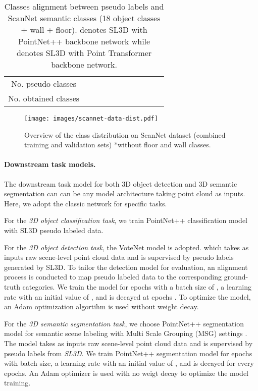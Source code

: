 \documentclass{article}
\begin{document}
\begin{table}[ht]
\caption{Classes alignment between pseudo labels and ScanNet semantic classes (18 object classes + wall + floor).  denotes SL3D with PointNet++ backbone network while  denotes SL3D with Point Transformer backbone network.}
\centering
\begin{tabular}{c | c c c c c c c c c c}

\toprule

 {No. pseudo classes} & {} & {} & {} & {} & {} & {} & {} & {} & {} & {} \\  
 {No. obtained classes} & {} & {} & {} & {} & {} & {} & {} & {} & {} & {} \\ \bottomrule
\end{tabular}
\label{table:1}
\end{table}

\vspace{-5mm}

\begin{wrapfigure}{r}{5.5cm}
\label{wrap-fig:1}
\texttt{[image: images/scannet-data-dist.pdf]}
\caption{Overview of the class distribution on ScanNet dataset (combined training and validation sets) *without floor and wall classes.}
\end{wrapfigure}

\paragraph{Downstream task models. } The downstream task model for both 3D object detection and 3D semantic segmentation can can be any model architecture taking point cloud as inputs. Here, we adopt the classic network for specific tasks.


For the \textit{3D object classification task}, we train PointNet++ \cite{qi2017pointnetplusplus} classification model with SL3D pseudo labeled data. 


For the \textit{3D object detection task}, the VoteNet \cite{qi2019deep} model is adopted. which takes as inputs raw scene-level point cloud data and is supervised by pseudo labels generated by SL3D. To tailor the detection model for evaluation, an alignment process is conducted to map pseudo labeled data to the corresponding ground-truth categories.
We train the model for  epochs with a batch size of , a learning rate with an initial value of , and is decayed  at epochs . 
To optimize the model, an Adam optimization algortihm is used without weight decay. 


For the \textit{3D semantic segmentation task}, we choose PointNet++ segmentation model for semantic scene labeling with Multi Scale Grouping (MSG) settings \cite{qi2017pointnetplusplus}. The model takes as inputs raw scene-level point cloud data and is supervised by pseudo labels from \textit{SL3D}. We train PointNet++ segmentation model for  epochs with  batch size, a learning rate with an initial value of , and is decayed  for every  epochs. An Adam optimizer is used with no weigt decay to optimize the model training.
\end{document}
